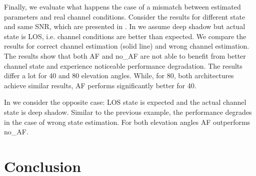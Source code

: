 \documentclass[conference]{IEEEtran}
\begin{document}
Finally, we evaluate what happens the case of a mismatch between estimated parameters and real channel conditions. 
Consider the results for different state and same SNR, which are presented in .
In  we assume deep shadow but actual state is LOS, i.e. channel conditions are better than expected. 
We compare the results for correct channel estimation (solid line) and wrong channel estimation.
The results show that both AF and no\_AF are not able to benefit from better channel state and experience noticeable performance degradation.
The results differ a lot for 40 and 80 elevation angles.
While, for 80, both architectures achieve similar results, 
AF performs significantly better for 40. 

In  we consider the opposite case: 
LOS state is expected and the actual channel state is deep shadow. 
Similar to the previous example, the performance degrades in the case of wrong state estimation. For both elevation angles AF outperforms no\_AF.





\section{Conclusion}
\label{sec:conclusion}



\end{document}
